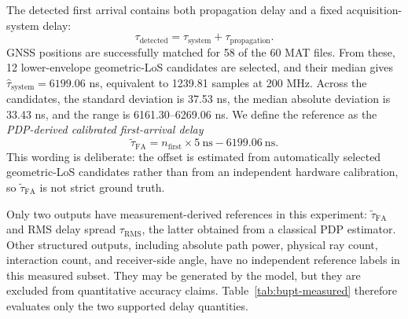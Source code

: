 The detected first arrival contains both propagation delay and a fixed acquisition-system delay:
\begin{equation}
\tau_{\mathrm{detected}}=
\tau_{\mathrm{system}}+\tau_{\mathrm{propagation}}.
\label{eq:measured-system-delay}
\end{equation}
GNSS positions are successfully matched for 58 of the 60 MAT files. From these, 12 lower-envelope
geometric-LoS candidates are selected, and their median gives
\(\hat{\tau}_{\mathrm{system}}=6199.06\) ns, equivalent to 1239.81 samples at 200 MHz.
Across the candidates, the standard deviation is 37.53 ns, the median absolute deviation is
33.43 ns, and the range is 6161.30--6269.06 ns. We define the reference as the
\emph{PDP-derived calibrated first-arrival delay}
\begingroup
\setlength{\abovedisplayskip}{4pt}
\setlength{\belowdisplayskip}{4pt}
\setlength{\abovedisplayshortskip}{4pt}
\setlength{\belowdisplayshortskip}{4pt}
\begin{equation}
\widetilde{\tau}_{\mathrm{FA}}=
n_{\mathrm{first}}\times5\ \mathrm{ns}-6199.06\ \mathrm{ns}.
\label{eq:measured-calibrated-first-arrival}
\end{equation}
\endgroup
This wording is deliberate: the offset is estimated from automatically selected geometric-LoS
candidates rather than from an independent hardware calibration, so
\(\widetilde{\tau}_{\mathrm{FA}}\) is not strict ground truth.

Only two outputs have measurement-derived references in this experiment:
\(\widetilde{\tau}_{\mathrm{FA}}\) and RMS delay spread \(\tau_{\mathrm{RMS}}\), the latter obtained
from a classical PDP estimator. Other structured outputs, including absolute path power, physical ray
count, interaction count, and receiver-side angle, have no independent reference labels in this
measured subset. They may be generated by the model, but they are excluded from quantitative
accuracy claims. Table~\ref{tab:bupt-measured} therefore evaluates only the two supported delay
quantities.

